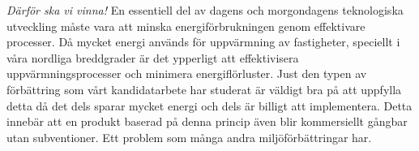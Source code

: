 \documentclass[11pt,a4paper]{article}
\begin{document}
\begin{multicols}{2}
\emph{\color{red}Därför ska vi vinna!}
En essentiell del av dagens och morgondagens teknologiska utveckling måste vara
att minska energiförbrukningen genom effektivare processer. Då mycket energi
används för uppvärmning av fastigheter, speciellt i våra nordliga breddgrader
är det ypperligt att effektivisera uppvärmningsprocesser och
minimera energiflörluster. Just den typen av förbättring som vårt kandidatarbete
har studerat är väldigt bra på att uppfylla detta då det dels sparar mycket energi
och dels är billigt att implementera. Detta innebär att en produkt baserad på
denna princip även blir kommersiellt gångbar utan subventioner. Ett problem
som många andra miljöförbättringar har. 


\end{multicols}
\end{document}
